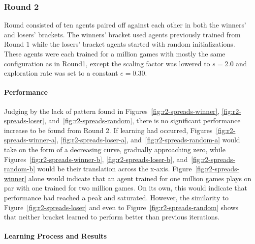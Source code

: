 
\subsubsection*{Round 2}
\label{sec:findings-r2}

Round consisted of ten agents paired off against each other
in both the winners' and losers' brackets.
%
The winners' bracket used agents previously trained from Round 1
while the losers' bracket agents started with random initializations.
%
These agents were each trained for a million games
with mostly the same configuration as in Round1,
except the scaling factor was lowered to $s = 2.0$
and exploration rate was set to a constant $e = 0.30$.

\paragraph*{Performance}
\label{sec:findings-r2-perf}

Judging by the lack of pattern found in
Figures~\ref{fig:r2-spreads-winner},
\ref{fig:r2-spreads-loser},
and~\ref{fig:r2-spreads-random},
there is no significant performance increase to be found from Round 2.
%
If learning had occurred,
Figures~\ref{fig:r2-spreads-winner-a},
\ref{fig:r2-spreads-loser-a},
and~\ref{fig:r2-spreads-random-a}
would take on the form of a decreasing curve,
gradually approaching zero,
while Figures~\ref{fig:r2-spreads-winner-b},
\ref{fig:r2-spreads-loser-b},
and~\ref{fig:r2-spreads-random-b}
would be their translation across the x-axis.
%
Figure~\ref{fig:r2-spreads-winner} alone
would indicate that an agent trained for one million games plays on par with
one trained for two million games.
%
On its own,
this would indicate that performance had reached a peak and saturated.
%
However,
the similarity to Figure~\ref{fig:r2-spreads-loser}
and even to Figure~\ref{fig:r2-spreads-random}
shows that neither bracket learned to perform better than previous iterations.









\paragraph*{Learning Process and Results}
\label{sec:findings-r2-results}

